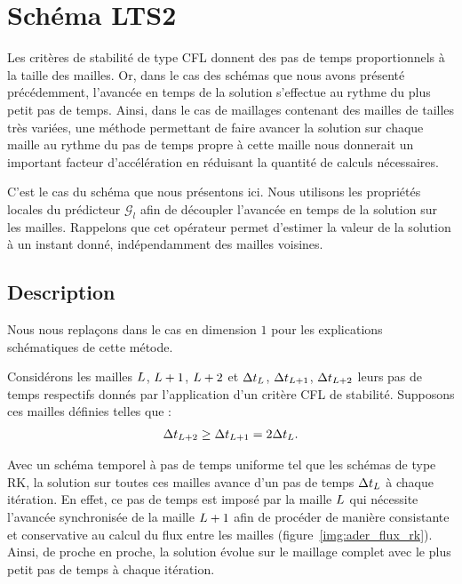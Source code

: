 \section{Schéma LTS2}
\label{sect:pas de temps local}


Les critères de stabilité de type CFL donnent des pas de temps 
proportionnels à la taille des mailles. Or, dans le cas
des schémas que nous avons présenté précédemment, l'avancée en temps
de la solution s'effectue au rythme du plus petit pas de temps.
Ainsi, dans le cas de maillages contenant des mailles de tailles très
variées, une méthode permettant de faire avancer la solution sur
chaque maille au rythme du pas de temps propre à cette maille
nous donnerait un important facteur d'accélération en réduisant
la quantité de calculs nécessaires.

C'est le cas du schéma que nous présentons ici.
Nous utilisons les propriétés locales du prédicteur $\mathcal{G}_l$
afin de découpler l'avancée en temps de la solution sur les mailles.
Rappelons que cet opérateur permet d'estimer la valeur de la solution
à un instant donné, indépendamment des mailles voisines.


\subsection{Description}
\label{ssect:lts2_desc}

\begin{remark}
	Nous nous replaçons dans le cas en dimension $1$ pour les explications
	schématiques de cette métode.
\end{remark}


Considérons les mailles $L$, $L+1$, $L+2$
et $\Delta t_L$, $\Delta t_{L+1}$, $\Delta t_{L+2}$ leurs pas
de temps respectifs donnés par l'application d'un critère CFL de stabilité.
Supposons ces mailles définies telles que :
\begin{align}
	\Delta t_{L+2} \ge \Delta t_{L+1} = 2 \Delta t_L .
\end{align}

Avec un schéma temporel à pas de temps uniforme tel que les schémas
de type RK, la solution sur toutes ces mailles
avance d'un pas de temps $\Delta t_L$ à chaque itération.
En effet, ce pas de temps est imposé par la maille $L$
qui nécessite l'avancée synchronisée de la maille $L+1$
afin de procéder de manière consistante et conservative au calcul
du flux entre les mailles (figure~\ref{img:ader_flux_rk}).
Ainsi, de proche en proche, la solution évolue sur le maillage complet
avec le plus petit pas de temps à chaque itération.

